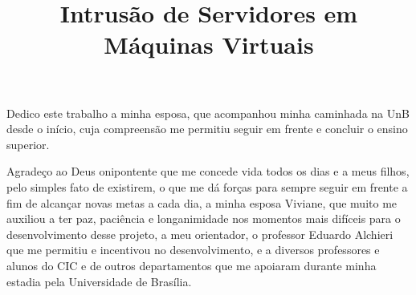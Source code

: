 \documentclass[licenciatura]{unb-cic}
\title{Intrusão de Servidores em Máquinas Virtuais}
\begin{document}
  \maketitle
  
  \pretextual

  \begin{dedicatoria}
  Dedico este trabalho a minha esposa, que acompanhou minha caminhada na UnB desde o início, cuja compreensão me permitiu seguir em frente e concluir o ensino superior.
  \end{dedicatoria}

  \begin{agradecimentos}
  Agradeço ao Deus onipontente que me concede vida todos os dias e a meus filhos, pelo simples fato de existirem, o que me dá forças para sempre seguir em frente a fim de alcançar novas metas a cada dia, a minha esposa Viviane, que muito me auxiliou a ter paz, paciência e longanimidade nos momentos mais difíceis para o desenvolvimento desse projeto, a meu orientador, o professor Eduardo Alchieri que me permitiu e incentivou no desenvolvimento, e a diversos professores e alunos do CIC e de outros departamentos que me apoiaram durante minha estadia pela Universidade de Brasília.
  \end{agradecimentos}
  \begin{resumo}
	
  \end{resumo}

  \begin{abstract}
	
  \end{abstract}

  \tableofcontents
  \listoffigures

  \textual
  
  
  
  
  
  
  
  


  \postextual
  
  
\end{document}
